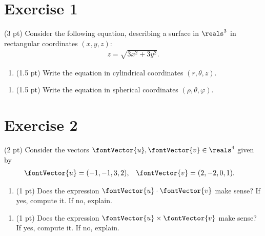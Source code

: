 \section{Exercise 1}

(3 pt) Consider the following equation, describing a surface in $\reals^{3}$ in rectangular coordinates $(x,y,z)$:
\begin{align*}
z
=
\sqrt{3 x^{2} + 3 y^{2}}.
\end{align*}
\begin{enumerate}[label=(\alph*)]
\item (1.5 pt) Write the equation in cylindrical coordinates $(r,\theta,z)$.
\end{enumerate}

\spaceSolution{1in}{}




\begin{enumerate}[resume,label=(\alph*)]
\item (1.5 pt) Write the equation in spherical coordinates $(\rho,\theta,\varphi)$.
\end{enumerate}

\spaceSolution{1.5in}{}





\section{Exercise 2}

(2 pt) Consider the vectors $\fontVector{u},\fontVector{v} \in \reals^{4}$ given by
\begin{align*}
\fontVector{u}
&=
(-1,-1,3,2),
&
\fontVector{v}
&=
(2,-2,0,1).
\end{align*}
\begin{enumerate}[label=(\alph*)]
\item (1 pt) Does the expression $\fontVector{u} \cdot \fontVector{v}$ make sense? If yes, compute it. If no, explain.
\end{enumerate}

\spaceSolution{.75in}{}



\begin{enumerate}[resume,label=(\alph*)]
\item (1 pt) Does the expression $\fontVector{u} \times \fontVector{v}$ make sense? If yes, compute it. If no, explain.
\end{enumerate}

\spaceSolution{.75in}{}